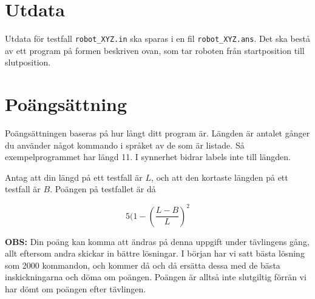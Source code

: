 \section*{Utdata}
Utdata för testfall \texttt{robot\_XYZ.in} ska sparas i en fil \texttt{robot\_XYZ.ans}. Det ska bestå av ett program på formen beskriven ovan, som tar roboten från startposition till slutposition.

\section*{Poängsättning}
Poängsättningen baseras på hur långt ditt program är. Längden är antalet gånger du använder något kommando i språket av de som är listade. Så exempelprogrammet har längd 11. I synnerhet bidrar labels inte till längden.

Antag att din längd på ett testfall är $L$, och att den kortaste längden på ett testfall är $B$. Poängen på testfallet är då

\[ 5 (1 - (\frac{L - B}{L})^2\]

\textbf{OBS:} Din poäng kan komma att ändras på denna uppgift under tävlingens gång, allt eftersom andra skickar in bättre lösningar. I början har vi satt bästa lösning som 2000 kommandon, och kommer då och då ersätta dessa
med de bästa inskickningarna och döma om poängen. Poängen är alltså inte slutgiltig förrän vi har dömt om poängen efter tävlingen.
